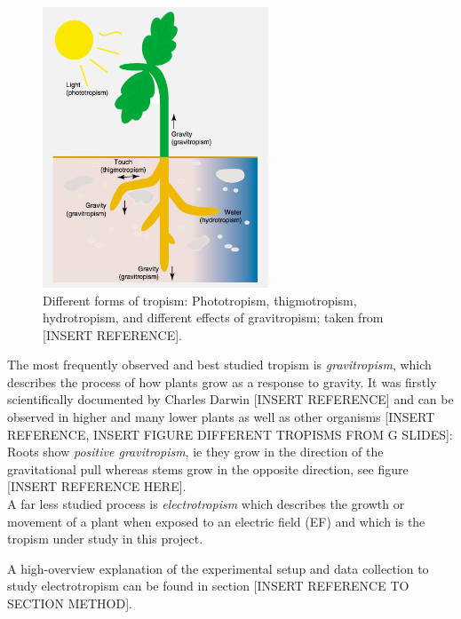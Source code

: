 \begin{figure}[H]
	\centering
	\includegraphics[width=0.6\textwidth]{../Figures/tropism.png}
	\caption{Different forms of tropism: Phototropism, thigmotropism, hydrotropism, and different effects of gravitropism; taken from [INSERT REFERENCE].}
	\label{fig:tropism}
\end{figure}

The most frequently observed and best studied tropism is \textit{gravitropism}, which describes the process of how plants grow as a response to gravity. It was firstly scientifically documented by Charles Darwin [INSERT REFERENCE] and can be observed in higher and many lower plants as well as other organisms [INSERT REFERENCE, INSERT FIGURE DIFFERENT TROPISMS FROM G SLIDES]: Roots show \textit{positive gravitropism}, ie they grow in the direction of the gravitational pull whereas stems grow in the opposite direction, see figure [INSERT REFERENCE HERE]. 
\\
A far less studied process is \textit{electrotropism} which describes the growth or movement of a plant when exposed to an electric field (EF) and which is the tropism under study in this project. 

A high-overview explanation of the experimental setup and data collection to study electrotropism can be found in section [INSERT REFERENCE TO SECTION METHOD].

